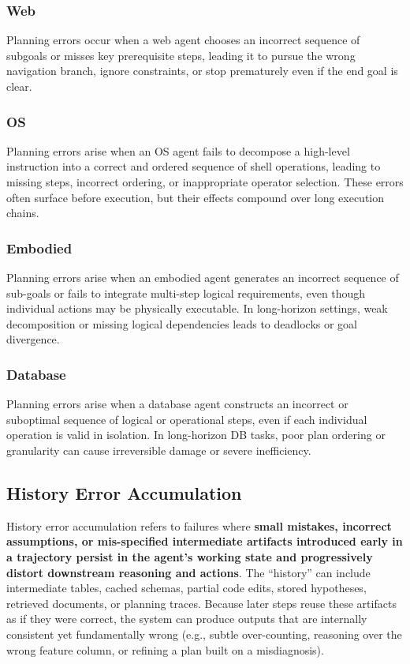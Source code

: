 \documentclass[11pt]{article}
\begin{document}
\subsubsection{Web}
Planning errors occur when a web agent chooses an incorrect sequence of subgoals or misses key prerequisite steps, leading it to pursue the wrong navigation branch, ignore constraints, or stop prematurely even if the end goal is clear.
\subsubsection{OS}
Planning errors arise when an OS agent fails to decompose a high-level instruction into a correct and ordered sequence of shell operations, leading to missing steps, incorrect ordering, or inappropriate operator selection. These errors often surface before execution, but their effects compound over long execution chains.

\subsubsection{Embodied}
Planning errors arise when an embodied agent generates an incorrect sequence of sub-goals or fails to integrate multi-step logical requirements, even though individual actions may be physically executable. In long-horizon settings, weak decomposition or missing logical dependencies leads to deadlocks or goal divergence.

\subsubsection{Database}
Planning errors arise when a database agent constructs an incorrect or suboptimal sequence of logical or operational steps, even if each individual operation is valid in isolation. In long-horizon DB tasks, poor plan ordering or granularity can cause irreversible damage or severe inefficiency.

\subsection{History Error Accumulation}
History error accumulation refers to failures where \textbf{small mistakes, incorrect assumptions, or mis-specified intermediate artifacts introduced early in a trajectory persist in the agent’s working state and progressively distort downstream reasoning and actions}. The “history” can include intermediate tables, cached schemas, partial code edits, stored hypotheses, retrieved documents, or planning traces. Because later steps reuse these artifacts as if they were correct, the system can produce outputs that are internally consistent yet fundamentally wrong (e.g., subtle over-counting, reasoning over the wrong feature column, or refining a plan built on a misdiagnosis).
\end{document}
